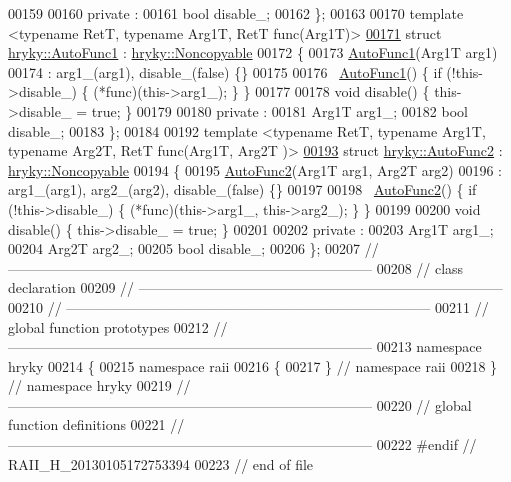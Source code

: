 \begin{DoxyCode}
00159 
00160 \textcolor{keyword}{private} :
00161     \textcolor{keywordtype}{bool}    disable\_;
00162 \};
00163 
00170 \textcolor{keyword}{template} <\textcolor{keyword}{typename} RetT, \textcolor{keyword}{typename} Arg1T, RetT func(Arg1T)>
\hypertarget{raii_8h_source_l00171}{}\hyperlink{structhryky_1_1_auto_func1}{00171} \textcolor{keyword}{struct }\hyperlink{structhryky_1_1_auto_func1}{hryky::AutoFunc1} : \hyperlink{classhryky_1_1_noncopyable}{hryky::Noncopyable}
00172 \{
00173     \hyperlink{structhryky_1_1_auto_func1}{AutoFunc1}(Arg1T arg1)
00174         : arg1\_(arg1), disable\_(\textcolor{keyword}{false}) \{\}
00175     
00176     ~\hyperlink{structhryky_1_1_auto_func1}{AutoFunc1}() \{ \textcolor{keywordflow}{if} (!this->disable\_) \{ (*func)(this->arg1\_); \} \}
00177 
00178     \textcolor{keywordtype}{void} disable() \{ this->disable\_ = \textcolor{keyword}{true}; \}
00179 
00180 \textcolor{keyword}{private} :
00181     Arg1T   arg1\_;
00182     \textcolor{keywordtype}{bool}    disable\_;
00183 \};
00184 
00192 \textcolor{keyword}{template} <\textcolor{keyword}{typename} RetT, \textcolor{keyword}{typename} Arg1T, \textcolor{keyword}{typename} Arg2T, RetT func(Arg1T, Arg2T
      )>
\hypertarget{raii_8h_source_l00193}{}\hyperlink{structhryky_1_1_auto_func2}{00193} \textcolor{keyword}{struct }\hyperlink{structhryky_1_1_auto_func2}{hryky::AutoFunc2} : \hyperlink{classhryky_1_1_noncopyable}{hryky::Noncopyable}
00194 \{
00195     \hyperlink{structhryky_1_1_auto_func2}{AutoFunc2}(Arg1T arg1, Arg2T arg2)
00196         : arg1\_(arg1), arg2\_(arg2), disable\_(\textcolor{keyword}{false}) \{\}
00197     
00198     ~\hyperlink{structhryky_1_1_auto_func2}{AutoFunc2}() \{ \textcolor{keywordflow}{if} (!this->disable\_) \{ (*func)(this->arg1\_, this->arg2\_); \} 
      \}
00199 
00200     \textcolor{keywordtype}{void} disable() \{ this->disable\_ = \textcolor{keyword}{true}; \}
00201 
00202 \textcolor{keyword}{private} :
00203     Arg1T   arg1\_;
00204     Arg2T   arg2\_;
00205     \textcolor{keywordtype}{bool}    disable\_;
00206 \};
00207 \textcolor{comment}{//
      ------------------------------------------------------------------------------}
00208 \textcolor{comment}{// class declaration}
00209 \textcolor{comment}{//
      ------------------------------------------------------------------------------}
00210 \textcolor{comment}{//
      ------------------------------------------------------------------------------}
00211 \textcolor{comment}{// global function prototypes}
00212 \textcolor{comment}{//
      ------------------------------------------------------------------------------}
00213 \textcolor{keyword}{namespace }hryky
00214 \{
00215 \textcolor{keyword}{namespace }raii
00216 \{
00217 \} \textcolor{comment}{// namespace raii}
00218 \} \textcolor{comment}{// namespace hryky}
00219 \textcolor{comment}{//
      ------------------------------------------------------------------------------}
00220 \textcolor{comment}{// global function definitions}
00221 \textcolor{comment}{//
      ------------------------------------------------------------------------------}
00222 \textcolor{preprocessor}{#endif // RAII\_H\_20130105172753394}
00223 \textcolor{preprocessor}{}\textcolor{comment}{// end of file}
\end{DoxyCode}
